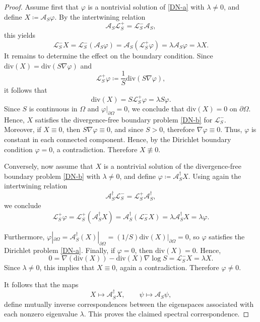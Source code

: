 \documentclass{amsart}
\theoremstyle{definition}
\theoremstyle{remark}
\numberwithin{equation}{section}
\newcommand{\diver}{{{\mathrm{div}}}}
\begin{document}
\begin{proof}
Assume first that $\varphi$ is a nontrivial solution of \eqref{DN-a} with $\lambda \neq 0$, and define $X \coloneq \mathcal A_S\varphi$. By the intertwining relation
\[
\mathcal A_S\mathscr L_S^{+} = \mathscr L_S^{-}\mathcal A_S,
\]
this yields
\[
\mathscr L_S^{-}X
= \mathscr L_S^{-}(\mathcal A_S\varphi)
= \mathcal A_S(\mathscr L_S^{+}\varphi)
= \lambda \mathcal A_S\varphi
= \lambda X.
\]
It remains to determine the effect on the boundary condition. Since $\diver(X)= \diver(S\nabla\varphi)$ and
\[
\mathscr{L}_S^{+} \varphi \coloneqq \dfrac{1}{S}\diver\left({S}\nabla\varphi \right),
\]
it follows that
\[
\diver(X) = S\mathscr L_S^{+}\varphi = \lambda S\varphi.
\]
Since $S$ is continuous in $\Omega$ and $\varphi|_{\partial \Omega}=0$, we conclude that $\diver(X)=0$ on $\partial \Omega$. Hence, $X$ satisfies the divergence-free boundary problem \eqref{DN-b} for $\mathscr L_S^{-}$. Moreover, if $X \equiv 0$, then $S \nabla\varphi\equiv 0$, and since $S>0$, therefore $\nabla \varphi\equiv 0$. Thus, $\varphi$ is constant in each connected component. Hence, by the Dirichlet boundary condition $\varphi = 0$, a contradiction. Therefore $X \not\equiv 0$.

Conversely, now assume that $X$ is a nontrivial solution of the divergence-free boundary problem \eqref{DN-b} with $\lambda \neq 0$, and define $\varphi \coloneq \mathcal{A}^\dag_SX$. Using again the intertwining relation
\[
\mathcal{A}^\dag_S\mathscr{L}_S^{-} = \mathscr{L}_S^{+}\mathcal{A}^\dag_S,
\]
we conclude
\[
\mathscr L_S^{+}\varphi = \mathscr L_S^{+}(\mathcal A^\dag_SX) = \mathcal A^\dag_S(\mathscr L_S^{-}X) =\lambda \mathcal{A}^\dag_SX = \lambda\varphi.
\]

Furthermore, $\varphi|_{\partial \Omega}= \mathcal{A}^\dag_S (X)|_{\partial \Omega} = (1/S) \diver(X)|_{\partial \Omega} = 0$, so $\varphi$ satisfies the Dirichlet problem \eqref{DN-a}. Finally, if $\varphi = 0$, then $\diver(X)=0$. Hence,
\[
0= \nabla\left( \diver(X) \right) - \diver(X) \nabla \log S =\mathscr L_S^{-}X= \lambda X.
\]
Since $\lambda \neq 0$, this implies that $X \equiv 0$, again a contradiction. Therefore $\varphi \neq 0$.

It follows that the maps
\[
X\mapsto \mathcal A_S^\dag X,
\qquad
\psi\mapsto \mathcal A_S\psi,
\]
define mutually inverse correspondences between the eigenspaces associated with each nonzero eigenvalue $\lambda$. This proves the claimed spectral correspondence.
\end{proof}
\end{document}
